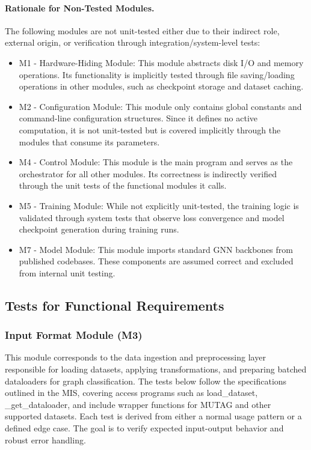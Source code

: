 \documentclass[12pt, titlepage]{article}
\begin{document}
\paragraph{Rationale for Non-Tested Modules.}
The following modules are not unit-tested either due to their indirect role, external origin, or verification through integration/system-level tests:

\begin{itemize}
  \item M1 - Hardware-Hiding Module: This module abstracts disk I/O and memory operations. Its functionality is implicitly tested through file saving/loading operations in other modules, such as checkpoint storage and dataset caching.
  
  \item M2 - Configuration Module: This module only contains global constants and command-line configuration structures. Since it defines no active computation, it is not unit-tested but is covered implicitly through the modules that consume its parameters.
  
  \item M4 - Control Module: This module is the main program and serves as the orchestrator for all other modules. Its correctness is indirectly verified through the unit tests of the functional modules it calls.

  \item M5 - Training Module: While not explicitly unit-tested, the training logic is validated through system tests that observe loss convergence and model checkpoint generation during training runs.
  
  \item M7 - Model Module: This module imports standard GNN backbones from published codebases. These components are assumed correct and excluded from internal unit testing.
\end{itemize}




\subsection{Tests for Functional Requirements}
\label{sub:unit FR}

\subsubsection{Input Format Module (M3)}

This module corresponds to the data ingestion and preprocessing layer responsible for loading datasets, applying transformations, and preparing batched dataloaders for graph classification. The tests below follow the specifications outlined in the MIS, covering access programs such as load\_dataset, \_get\_dataloader, and include wrapper functions for MUTAG and other supported datasets. Each test is derived from either a normal usage pattern or a defined edge case. The goal is to verify expected input-output behavior and robust error handling.
\end{document}
